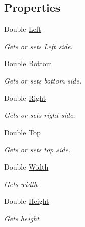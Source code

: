 \subsection*{Properties}
\begin{DoxyCompactItemize}
\item 
Double \hyperlink{class_pdf_file_writer_1_1_pdf_rectangle_ab9bdc68f02bdfab49439b04e597bdf97}{Left}
\begin{DoxyCompactList}\small\item\em Gets or sets Left side. \end{DoxyCompactList}\item 
Double \hyperlink{class_pdf_file_writer_1_1_pdf_rectangle_a87bb8dca49ad7a4bedd4f449a5e56db1}{Bottom}
\begin{DoxyCompactList}\small\item\em Gets or sets bottom side. \end{DoxyCompactList}\item 
Double \hyperlink{class_pdf_file_writer_1_1_pdf_rectangle_ae0d410f44d87053e0125255b4e139fcb}{Right}
\begin{DoxyCompactList}\small\item\em Gets or sets right side. \end{DoxyCompactList}\item 
Double \hyperlink{class_pdf_file_writer_1_1_pdf_rectangle_a6f32d2a09f4e0bb8168a4633fb585ff9}{Top}
\begin{DoxyCompactList}\small\item\em Gets or sets top side. \end{DoxyCompactList}\item 
Double \hyperlink{class_pdf_file_writer_1_1_pdf_rectangle_a1f512a0417ad053ea4b29df9e31adff7}{Width}
\begin{DoxyCompactList}\small\item\em Gets width \end{DoxyCompactList}\item 
Double \hyperlink{class_pdf_file_writer_1_1_pdf_rectangle_a22ce779c7843f7e36611253c92629ffb}{Height}
\begin{DoxyCompactList}\small\item\em Gets height \end{DoxyCompactList}\end{DoxyCompactItemize}


